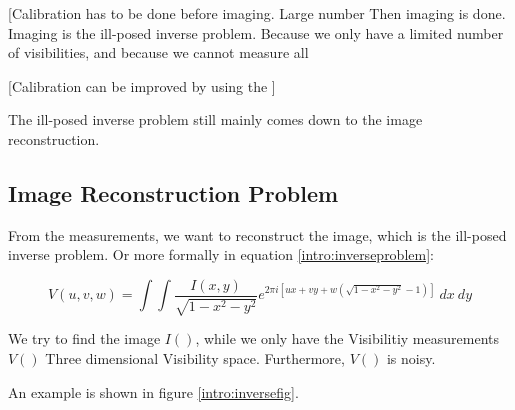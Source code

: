 [Calibration has to be done before imaging. Large number
Then imaging is done. Imaging is the ill-posed inverse problem. Because we only have a limited number of visibilities, and because we cannot measure all 

[Calibration can be improved by using the ]

The ill-posed inverse problem still mainly comes down to the image reconstruction.


\subsection{Image Reconstruction Problem}
From the measurements, we want to reconstruct the image, which is the ill-posed inverse problem. Or more formally in equation \eqref{intro:inverseproblem}:

\begin{equation}\label{intro:inverseproblem}
V(u, v, w) = \int\int \frac{I(x, y)}{\sqrt{1 - x^2 - y ^2}} e^{2 \pi i [ux+vy+ w(\sqrt{1 - x^2 - y ^2} - 1)]} \: dx \: dy
\end{equation}

We try to find the image $I()$, while we only have the Visibilitiy measurements $V()$
Three dimensional Visibility space.
Furthermore, $V()$ is noisy.

An example is shown in figure \ref{intro:inversefig}.

